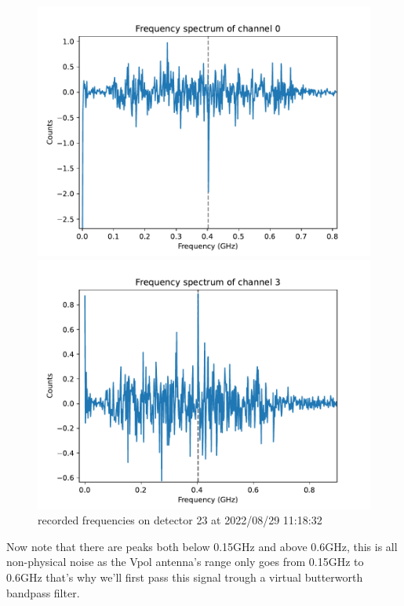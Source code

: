 \begin{figure}
	\begin{minipage}{0.49\textwidth}
		\includegraphics[width=\textwidth]{figures/23-800-0-freq.pdf}
	\end{minipage}
	\begin{minipage}{0.49\textwidth}
		\includegraphics[width=\textwidth]{figures/23-800-3-freq.pdf}
	\end{minipage}
	\caption{recorded frequencies on detector 23 at 2022/08/29 11:18:32}
	\label{fig:freqs03}
\end{figure}
Now note that there are peaks both below 0.15GHz and above 0.6GHz,
this is all non-physical noise as the Vpol antenna's range only goes from
0.15GHz to 0.6GHz \cite{Aguilar_2021} that's why we'll first pass this signal
trough a virtual butterworth bandpass filter.

